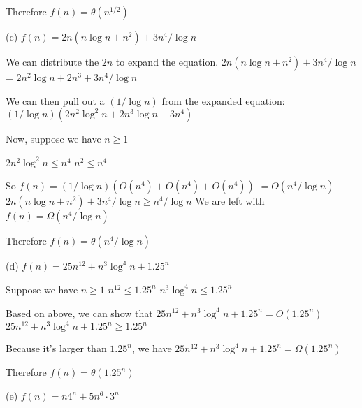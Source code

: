 \documentclass{article}
\begin{document}
\begin{solution}
\begin{description}
Therefore $f(n) = \theta(n^{1/2})$

\item{(c)} $f(n) = 2n ( n\log n + n^2) + 3n^4/\log n$
\newline

We can distribute the $2n$ to expand the equation.
\newline
$2n ( n\log n + n^2) + 3n^4/\log n $
\newline
= $2n^2\log n + 2n^3 + 3n^4/\log n$

\newline
We can then pull out a $(1/\log n)$ from the expanded equation:
\newline
$(1/\log n)(2n^2\log^2 n + 2n^3\log n + 3n^4)$

Now, suppose we have $n \ge 1$

$2n^2\log^2 n \le n^4$
\newline
$n^2 \le n^4$
\newline

So $f(n) = (1/\log n)(O(n^4) + O(n^4) + O(n^4))$
\newline
$=O(n^4/\log n)$
\newline
$2n (n\log n + n^2) + 3n^4/\log n \ge n^4/\log n$
\newline
We are left with $f(n) = \Omega(n^4/\log n)$
\newline

Therefore $f(n) = \theta(n^4/\log n)$
\newline

\item{(d)} $f(n) = 25n^{12} + n^3\log^4 n + 1.25^n $
\newline

Suppose we have $ n \ge 1$
\newline
$n^{12} \le 1.25^n$
\newline
$n^3\log^4 n \le 1.25^n$
\newline

Based on above, we can show that $25n^{12} + n^3\log^4 n + 1.25^n = O(1.25^n)$
\newline
$25n^{12} + n^3\log^4 n + 1.25^n \ge 1.25^n$

Because it's larger than $1.25^n$, we have 
\newline
$25n^{12} + n^3\log^4 n + 1.25^n = \Omega(1.25^n)$
\newline

Therefore $f(n) = \theta(1.25^n)$
\newline

\item{(e)} $f(n) = n4^n + 5n^6 \cdot 3^n$
\newline


\end{description}
\end{solution}
\end{document}
